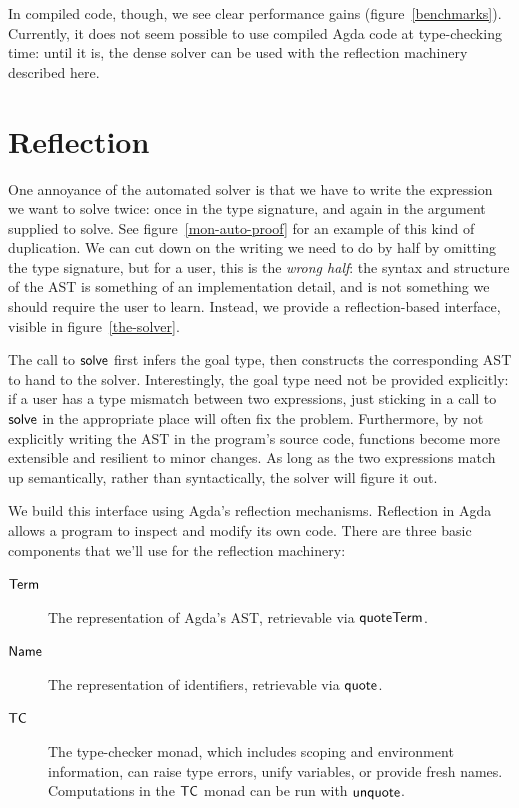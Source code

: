 \documentclass[draft, twocolumn]{article}
\theoremstyle{definition}
\theoremstyle{definition}
\begin{document}
In compiled code, though, we see clear performance gains
(figure~\ref{benchmarks}). Currently, it does not seem possible to use compiled
Agda code at type-checking time: until it is, the dense solver can be used with
the reflection machinery described here.
\section{Reflection} \label{reflection}
One annoyance of the automated solver is that we have to write the expression we
want to solve twice: once in the type signature, and again in the argument
supplied to solve. See figure~\ref{mon-auto-proof} for an example of this kind
of duplication. We can cut down on the writing we need to do by half by omitting
the type signature, but for a user, this is the \emph{wrong half}: the syntax
and structure of the AST is something of an implementation detail, and is not
something we should require the user to learn. Instead, we provide a
reflection-based interface, visible in figure~\ref{the-solver}.

The call to \(\AgdaMacro{solve}\) first infers the goal type, then constructs
the corresponding AST to hand to the solver. Interestingly, the goal type need
not be provided explicitly: if a user has a type mismatch between two
expressions, just sticking in a call to \(\AgdaMacro{solve}\) in the appropriate
place will often fix the problem. Furthermore, by not explicitly writing the AST
in the program's source code, functions become more extensible and resilient to
minor changes. As long as the two expressions match up semantically, rather than
syntactically, the solver will figure it out.

We build this interface using Agda's reflection
mechanisms\cite{van_der_walt_reflection_2012}. Reflection in Agda allows a
program to inspect and modify its own code. There are three basic components
that we'll use for the reflection machinery:
\begin{description}
  \item[\(\AgdaDatatype{Term}\)] The representation of Agda's AST, retrievable
    via \(\AgdaKeyword{quoteTerm}\).
  \item[\(\AgdaDatatype{Name}\)] The representation of identifiers, retrievable
    via \(\AgdaKeyword{quote}\).
  \item[\(\AgdaDatatype{TC}\)] The type-checker monad, which includes scoping
    and environment information, can raise type errors, unify variables, or
    provide fresh names. Computations in the \(\AgdaDatatype{TC}\) monad can be
    run with \(\AgdaKeyword{unquote}\).
\end{description}
\end{document}
